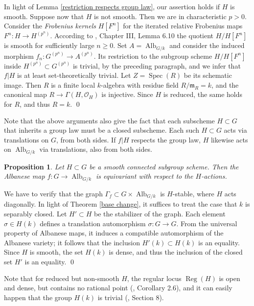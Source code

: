 \documentclass[oneside, 12pt]{amsart}
\newcommand\mylabel[1]{\label{#1}\marginpar{\vspace{-1ex}\medskip\medskip\footnotesize \tt #1}}
\renewcommand\mylabel[1]{\label{#1}}
\newtheorem{proposition}[theorem]{Proposition}
\theoremstyle{definition}
\theoremstyle{remark}
\newcommand{\Alb}{\operatorname{Alb}}
\newcommand{\maxid}{\mathfrak{m}}
\renewcommand{\O}{\mathscr{O}}
\newcommand{\ra}{\rightarrow}
\newcommand{\Reg}{\operatorname{Reg}}
\newcommand{\Spec}{\operatorname{Spec}}
\begin{document}
In light of Lemma \ref{restriction respects group law}, our assertion holds if $H$ is smooth.
Suppose now that $H$ is not smooth. Then we are in characteristic $p>0$.
Consider the \emph{Frobenius kernels} $H[F^n]$ for the iterated relative Frobenius maps
$F^n:H\ra H^{(p^n)}$. According to \cite{Demazure; Gabriel 1970}, Chapter III, Lemma 6.10  the quotient $H/H[F^n]$ is smooth
for sufficiently large $n\geq 0$. Set $A=\Alb_{G/k}$ and consider the induced morphism $f_n:G^{(p^n)}\ra A^{(p^n)}$.
Its restriction to the subgroup scheme $H/H[F^n]$ inside $ H^{(p^n)}\subset G^{(p^n)}$ is  trivial, by the preceding paragraph,
and we infer that $f|H$ is at least set-theoretically trivial.
Let $Z=\Spec(R)$ be its schematic image. Then $R$ is a finite local $k$-algebra with residue field $R/\maxid_R=k$,
and the canonical map $R\ra\Gamma(H,\O_H)$ is injective. Since $H$ is reduced, the same holds for $R$,
and thus $R=k$.
\qed

\medskip
Note that the above arguments also give the fact  that each subscheme $H\subset G$ that inherits a group law must be a closed subscheme.
Each such $H\subset G$ acts via translations  on $G$, from both sides.
If $f|H$ respects the group law,  $H$ likewise acts on $\Alb_{G/k}$   via translations, also from both sides.

\begin{proposition}
\mylabel{albanese map is equivariant}
Let $H\subset G$ be a smooth connected subgroup scheme.  
Then the Albanese map $f:G\ra\Alb_{G/k}$ is equivariant with respect to the $H$-actions.
\end{proposition}

\proof
We have to verify that the graph $\Gamma_f\subset G\times\Alb_{G/k}$
is $H$-stable, where $H$ acts diagonally. In light of Theorem \ref{base change}, it suffices to treat the case that $k$ is separably closed.
Let $H'\subset H$ be the stabilizer of the graph.
Each element $\sigma\in H(k)$ defines a translation automorphism $\sigma:G\ra G$.
From the universal property of Albanese maps, it induces a compatible automorphism  
of the Albanese variety; it follows that   the inclusion $H'(k)\subset H(k)$ is an equality.
Since $H$ is smooth, the set $H(k)$ is dense, and thus the inclusion of the closed set  $H'$ is an equality.
\qed

\medskip
Note that for reduced but non-smooth $H$, the regular locus $\Reg(H)$ is open and dense, but contains
no rational point (\cite{Fanelli; Schroeer 2020a}, Corollary 2.6), and it can  easily happen that the group  $H(k)$
is trivial (\cite{Schroeer; Tziolas 2023}, Section 8).
\end{document}
